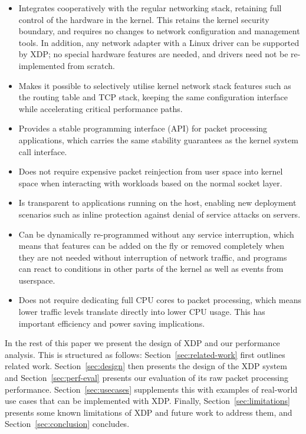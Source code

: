 \documentclass[sigconf]{acmart}
\begin{document}
\begin{itemize}
\item Integrates cooperatively with the regular networking stack, retaining full
  control of the hardware in the kernel. This retains the kernel security
  boundary, and requires no changes to network configuration and management
  tools. In addition, any network adapter with a Linux driver can be supported
  by XDP; no special hardware features are needed, and drivers need not be
  re-implemented from scratch.

\item Makes it possible to selectively utilise kernel network stack features
  such as the routing table and TCP stack, keeping the same configuration
  interface while accelerating critical performance paths.

\item Provides a stable programming interface (API) for packet processing
  applications, which carries the same stability guarantees as the kernel system
  call interface.

\item Does not require expensive packet reinjection from user space into kernel
  space when interacting with workloads based on the normal socket layer.

\item Is transparent to applications running on the host, enabling new
  deployment scenarios such as inline protection against denial of service
  attacks on servers.

\item Can be dynamically re-programmed without any service interruption, which
  means that features can be added on the fly or removed completely when they
  are not needed without interruption of network traffic, and programs can
  react to conditions in other parts of the kernel as well as events from
  userspace.

\item Does not require dedicating full CPU cores to packet processing, which
  means lower traffic levels translate directly into lower CPU usage. This has
  important efficiency and power saving implications.
\end{itemize}

In the rest of this paper we present the design of XDP and our performance
analysis. This is structured as follows: Section~\ref{sec:related-work} first
outlines related work. Section~\ref{sec:design} then presents the design of the
XDP system and Section~\ref{sec:perf-eval} presents our evaluation of its raw
packet processing performance. Section~\ref{sec:usecases} supplements this with
examples of real-world use cases that can be implemented with XDP. Finally,
Section~\ref{sec:limitations} presents some known limitations of XDP and future
work to address them, and Section~\ref{sec:conclusion} concludes.
\end{document}
